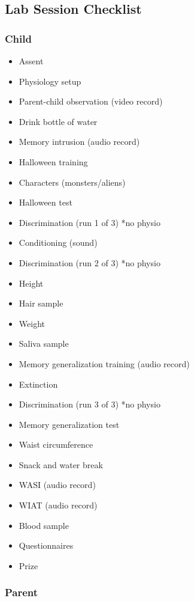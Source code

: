 \documentclass[]{book}
\providecommand{\tightlist}{%
  \setlength{\itemsep}{0pt}\setlength{\parskip}{0pt}}
\begin{document}
\hypertarget{lab-session-checklist}{%
\subsection{Lab Session Checklist}\label{lab-session-checklist}}

\hypertarget{child}{%
\subsubsection{Child}\label{child}}

\begin{itemize}
\tightlist
\item
  Assent
\item
  Physiology setup
\item
  Parent-child observation (video record)
\item
  Drink bottle of water
\item
  Memory intrusion (audio record)
\item
  Halloween training
\item
  Characters (monsters/aliens)
\item
  Halloween test
\item
  Discrimination (run 1 of 3) *no physio
\item
  Conditioning (sound)
\item
  Discrimination (run 2 of 3) *no physio
\item
  Height
\item
  Hair sample
\item
  Weight
\item
  Saliva sample
\item
  Memory generalization training (audio record)
\item
  Extinction
\item
  Discrimination (run 3 of 3) *no physio
\item
  Memory generalization test
\item
  Waist circumference
\item
  Snack and water break
\item
  WASI (audio record)
\item
  WIAT (audio record)
\item
  Blood sample
\item
  Questionnaires
\item
  Prize
\end{itemize}

\hypertarget{parent}{%
\subsubsection{Parent}\label{parent}}
\end{document}
